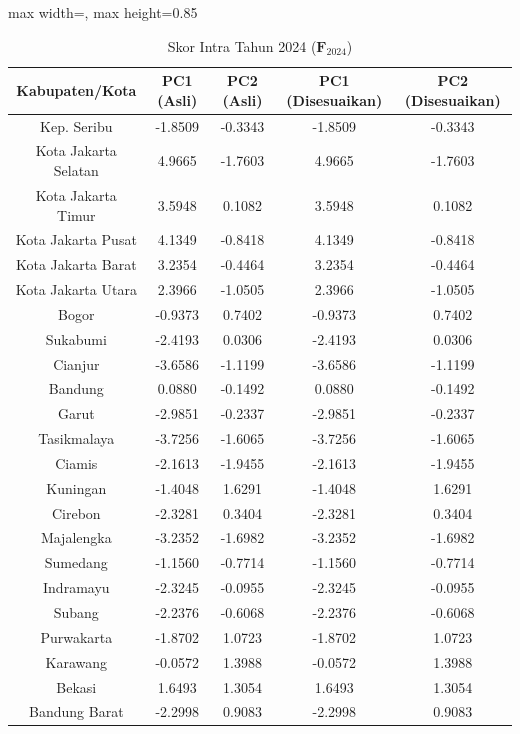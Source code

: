 \begin{table}[H]
\centering
\caption{Skor Intra Tahun 2024 ($\mathbf{F}_{2024}$)} \label{tab:appskor_intra_2024}
\begin{adjustbox}{max width=\textwidth, max height=0.85\textheight}
\begin{tabular}{|c|c|c|c|c|}
\hline
\textbf{Kabupaten/Kota} & \textbf{PC1 (Asli)} & \textbf{PC2 (Asli)} & \textbf{PC1 (Disesuaikan)} & \textbf{PC2 (Disesuaikan)} \\
\hline
Kep. Seribu & -1.8509 & -0.3343 & -1.8509 & -0.3343 \\
Kota Jakarta Selatan & 4.9665 & -1.7603 & 4.9665 & -1.7603 \\
Kota Jakarta Timur & 3.5948 & 0.1082 & 3.5948 & 0.1082 \\
Kota Jakarta Pusat & 4.1349 & -0.8418 & 4.1349 & -0.8418 \\
Kota Jakarta Barat & 3.2354 & -0.4464 & 3.2354 & -0.4464 \\
Kota Jakarta Utara & 2.3966 & -1.0505 & 2.3966 & -1.0505 \\
Bogor & -0.9373 & 0.7402 & -0.9373 & 0.7402 \\
Sukabumi & -2.4193 & 0.0306 & -2.4193 & 0.0306 \\
Cianjur & -3.6586 & -1.1199 & -3.6586 & -1.1199 \\
Bandung & 0.0880 & -0.1492 & 0.0880 & -0.1492 \\
Garut & -2.9851 & -0.2337 & -2.9851 & -0.2337 \\
Tasikmalaya & -3.7256 & -1.6065 & -3.7256 & -1.6065 \\
Ciamis & -2.1613 & -1.9455 & -2.1613 & -1.9455 \\
Kuningan & -1.4048 & 1.6291 & -1.4048 & 1.6291 \\
Cirebon & -2.3281 & 0.3404 & -2.3281 & 0.3404 \\
Majalengka & -3.2352 & -1.6982 & -3.2352 & -1.6982 \\
Sumedang & -1.1560 & -0.7714 & -1.1560 & -0.7714 \\
Indramayu & -2.3245 & -0.0955 & -2.3245 & -0.0955 \\
Subang & -2.2376 & -0.6068 & -2.2376 & -0.6068 \\
Purwakarta & -1.8702 & 1.0723 & -1.8702 & 1.0723 \\
Karawang & -0.0572 & 1.3988 & -0.0572 & 1.3988 \\
Bekasi & 1.6493 & 1.3054 & 1.6493 & 1.3054 \\
Bandung Barat & -2.2998 & 0.9083 & -2.2998 & 0.9083 \\

\end{tabular}
\end{adjustbox}
\end{table}

